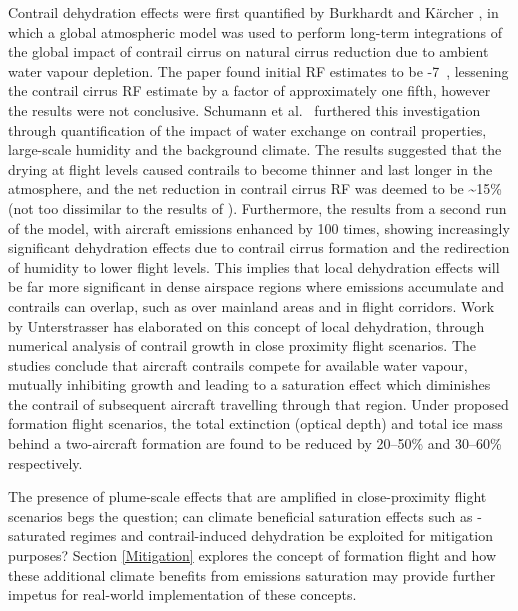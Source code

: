 Contrail dehydration effects were first quantified by Burkhardt and K\"{a}rcher \cite{Burkhardt2011}, in which a global atmospheric model was used to perform long-term integrations of the global impact of contrail cirrus on natural cirrus reduction due to ambient water vapour depletion. The paper found initial RF estimates to be -7~, lessening the contrail cirrus RF estimate by a factor of approximately one fifth, however the results were not conclusive. Schumann et al.\ \cite{Schumann2015} furthered this investigation through quantification of the impact of water exchange on contrail properties, large-scale humidity and the background climate. The results suggested that the drying at flight levels caused contrails to become thinner and last longer in the atmosphere, and the net reduction in contrail cirrus RF was deemed to be \textasciitilde15\% (not too dissimilar to the results of \cite{Burkhardt2011}). Furthermore, the results from a second run of the model, with aircraft emissions enhanced by 100 times, showing increasingly significant dehydration effects due to contrail cirrus formation and the redirection of humidity to lower flight levels. This implies that local dehydration effects will be far more significant in dense airspace regions where emissions accumulate and contrails can overlap, such as over mainland areas and in flight corridors. Work by Unterstrasser \cite{Unterstrasser2010, Unterstrasser2020} has elaborated on this concept of local dehydration, through numerical analysis of contrail growth in close proximity flight scenarios. The studies conclude that aircraft contrails compete for available water vapour, mutually inhibiting growth and leading to a saturation effect which diminishes the contrail of subsequent aircraft travelling through that region. Under proposed formation flight scenarios, the total extinction (optical depth) and total ice mass behind a two-aircraft formation are found to be reduced by 20--50\% and 30--60\% respectively.

The presence of plume-scale effects that are amplified in close-proximity flight scenarios begs the question; can climate beneficial saturation effects such as -saturated regimes and contrail-induced dehydration be exploited for mitigation purposes? Section \ref{Mitigation} explores the concept of formation flight and how these additional climate benefits from emissions saturation may provide further impetus for real-world implementation of these concepts.

